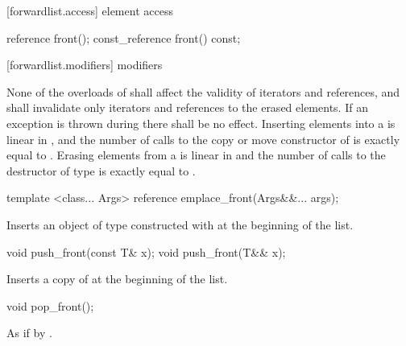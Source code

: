 [forwardlist.access]{ element access}

%
\begin{itemdecl}
reference front();
const_reference front() const;
\end{itemdecl}

\begin{itemdescr}
\pnum
\returns {}
\end{itemdescr}

[forwardlist.modifiers]{ modifiers}

\pnum
None of the overloads of  shall affect the validity of iterators and
references, and  shall invalidate only iterators and references to
the erased elements. If an exception is thrown during  there shall
be no effect. Inserting  elements into a  is linear in
, and the number of calls to the copy or move constructor of  is
exactly equal to . Erasing  elements from a  is
linear in  and the number of calls to the destructor of type  is
exactly equal to .

%
\begin{itemdecl}
template <class... Args> reference emplace_front(Args&&... args);
\end{itemdecl}

\begin{itemdescr}
\pnum
\effects Inserts an object of type  constructed with
 at the beginning of the list.
\end{itemdescr}

%
\begin{itemdecl}
void push_front(const T& x);
void push_front(T&& x);
\end{itemdecl}

\begin{itemdescr}
\pnum
\effects Inserts a copy of  at the beginning of the list.
\end{itemdescr}


%
\begin{itemdecl}
void pop_front();
\end{itemdecl}

\begin{itemdescr}
\pnum
\effects As if by .
\end{itemdescr}

